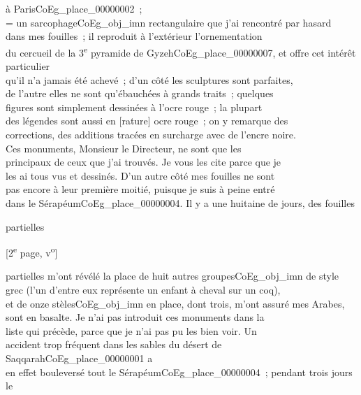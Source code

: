 \documentclass{book}
\begin{document}
à Paris\gls{CoEg_place_00000002}~;\\
 = un sarcophage\gls{CoEg_obj_imn} rectangulaire que j’ai rencontré par hasard\\
dans mes fouilles~; il reproduit à l’extérieur l’ornementation\\
du cercueil de la 3\textsuperscript{e} pyramide de Gyzeh\gls{CoEg_place_00000007}, et offre cet intérêt particulier\\
qu’il n’a jamais été achevé~; d’un côté les sculptures sont parfaites,\\
de l’autre elles ne sont qu’ébauchées à grands traits~; quelques\\
figures sont simplement dessinées à l’ocre rouge~; la plupart\\
des légendes sont aussi en [rature] ocre rouge~; on y remarque des\\
corrections, des additions tracées en surcharge avec de l’encre noire.\\
\indent Ces monuments, Monsieur le Directeur, ne sont que les\\
principaux de ceux que j’ai trouvés. Je vous les cite parce que je\\
les ai tous vus et dessinés. D’un autre côté mes fouilles ne sont\\
pas encore à leur première moitié, puisque je suis à peine entré\\
dans le Sérapéum\gls{CoEg_place_00000004}. Il y a une huitaine de jours, des fouilles
\begin{flushright}partielles\end{flushright}
{\footnotesize \begin{center} [2\textsuperscript{e} page, v\textsuperscript{o}]\end{center}}
\noindent partielles m’ont révélé la place de huit autres groupes\gls{CoEg_obj_imn} de style\\
grec (l’un d’entre eux représente un enfant à cheval sur un coq),\\
et de onze stèles\gls{CoEg_obj_imn} en place, dont trois, m’ont assuré mes Arabes,\\
sont en basalte. Je n’ai pas introduit ces monuments dans la\\
liste qui précède, parce que je n’ai pas pu les bien voir. Un\\
accident trop fréquent dans les sables du désert de Saqqarah\gls{CoEg_place_00000001} a\\
en effet bouleversé tout le Sérapéum\gls{CoEg_place_00000004}~; pendant trois jours le\\
\end{document}
